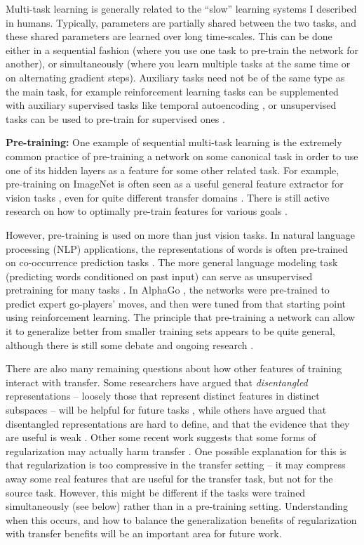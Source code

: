 Multi-task learning is generally related to the ``slow'' learning systems I described in humans. Typically, parameters are partially shared between the two tasks, and these shared parameters are learned over long time-scales. This can be done either in a sequential fashion (where you use one task to pre-train the network for another), or simultaneously (where you learn multiple tasks at the same time or on alternating gradient steps). Auxiliary tasks need not be of the same type as the main task, for example reinforcement learning tasks can be supplemented with auxiliary supervised tasks like temporal autoencoding \citep[e.g.][]{Hermann2017}, or unsupervised tasks can be used to pre-train for supervised ones \citep[e.g.][]{Wu2018}. \par
\textbf{Pre-training:} One example of sequential multi-task learning is the extremely common practice of pre-training a network on some canonical task in order to use one of its hidden layers as a feature for some other related task. For example, pre-training on ImageNet \citep{Deng2009} is often seen as a useful general feature extractor for vision tasks \citep{Huh2016}, even for quite different transfer domains \citep[e.g.][]{Marmanis2016}. There is still active research on how to optimally pre-train features for various goals \citep[e.g.][]{Wu2018}. \par    
However, pre-training is used on more than just vision tasks. In natural language processing (NLP) applications, the representations of words is often pre-trained on co-occurrence prediction tasks \citep[e.g.][]{Pennington2014}. The more general language modeling task (predicting words conditioned on past input) can serve as unsupervised pretraining for many tasks \citep[e.g.][]{Radford2019}. In AlphaGo \citep{Silver2016}, the networks were pre-trained to predict expert go-players' moves, and then were tuned from that starting point using reinforcement learning. The principle that pre-training a network can allow it to generalize better from smaller training sets appears to be quite general, although there is still some debate and ongoing research \citep[e.g]{He2018, Silver2017}. \par
There are also many remaining questions about how other features of training interact with transfer. Some researchers have argued that \emph{disentangled} representations -- loosely those that represent distinct features in distinct subspaces -- will be helpful for future tasks \citep{Higgins2018}, while others have argued that disentangled representations are hard to define, and that the evidence that they are useful is weak \citep{Locatello2019}. Other some recent work suggests that some forms of regularization may actually harm transfer \citep{Kornblith2019}. One possible explanation for this is that regularization is too compressive in the transfer setting -- it may compress away some real features that are useful for the transfer task, but not for the source task. However, this might be different if the tasks were trained simultaneously (see below) rather than in a pre-training setting. Understanding when this occurs, and how to balance the generalization benefits of regularization with transfer benefits will be an important area for future work. \par

